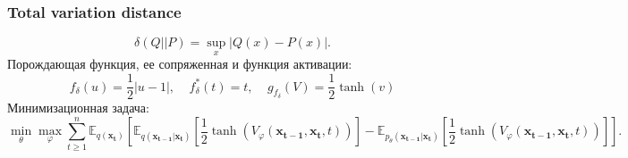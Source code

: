 \documentclass{article}
\begin{document}
\subsubsection{Total variation distance}
\begin{equation}
	\delta (Q||P) = \sup\limits_x|Q(x) - P(x)|.
\end{equation}
Порождающая функция, ее сопряженная и функция активации:
\begin{equation}
	f_{\delta}(u) = \frac{1}{2}|u-1|, ~~~~~ f^*_{\delta}(t) = t, ~~~~~ g_{f_{\delta}}(V) = \frac{1}{2}\tanh{(v)}
\end{equation}
Минимизационная задача:
\begin{equation}
	\min\limits_\theta\max\limits_\varphi\sum\limits_{t\geqslant 1}^n \mathbb{E}_{q(\mathbf{x_t})}\left[\mathbb{E}_{q(\mathbf{x_{t-1}}|\mathbf{x_t})}\left[\frac{1}{2}\tanh{(V_\varphi(\mathbf{x_{t-1}}, \mathbf{x_t}, t))}\right] - \mathbb{E}_{p_\theta(\mathbf{x_{t-1}}|\mathbf{x_t})}\left[\frac{1}{2}\tanh{(V_\varphi(\mathbf{x_{t-1}}, \mathbf{x_t}, t))}\right]\right].
\end{equation}\\
\end{document}
